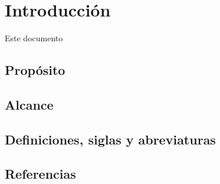 \chapter{Introducci\'on}
 Este documento
\section{Prop\'osito}

\section{Alcance}

\section{Definiciones, siglas y abreviaturas}

\section{Referencias}
